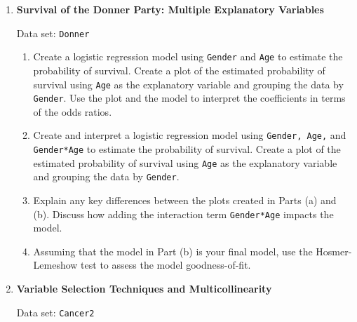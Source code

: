 \documentclass[
]{book}
\begin{document}
\begin{enumerate}
  \item \textbf{Survival of the Donner Party: Multiple Explanatory Variables}

Data set: \texttt{Donner}

  \begin{enumerate}
    \item Create a logistic regression model using \texttt{Gender} and \texttt{Age} to estimate the probability of survival. Create a plot of the estimated probability of survival using \texttt{Age} as the explanatory variable and grouping the data by \texttt{Gender}. Use the plot and the model to interpret the coefficients in terms of the odds ratios.
    \item Create and interpret a logistic regression model using \texttt{Gender, Age,} and \texttt{Gender*Age} to estimate the probability of survival. Create a plot of the estimated probability of survival using \texttt{Age} as the explanatory variable and grouping the data by \texttt{Gender}.
    \item Explain any key differences between the plots created in Parts (a) and (b). Discuss how adding the interaction term \texttt{Gender*Age} impacts the model.
    \item Assuming that the model in Part (b) is your final model, use the Hosmer-Lemeshow test to assess the model goodness-of-fit.
  \end{enumerate}

  \item \textbf{Variable Selection Techniques and Multicollinearity}

Data set: \texttt{Cancer2}


\end{enumerate}
\end{document}
